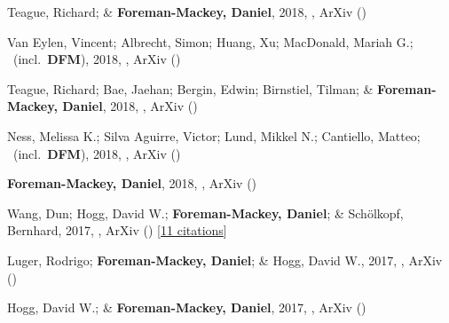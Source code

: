 \item[{\color{numcolor}\scriptsize37}] Teague, Richard; \& \textbf{Foreman-Mackey, Daniel}, 2018, , ArXiv ()

\item[{\color{numcolor}\scriptsize36}] Van Eylen, Vincent; Albrecht, Simon; Huang, Xu; MacDonald, Mariah G.; \etal\ (incl.\ \textbf{DFM}), 2018, , ArXiv ()

\item[{\color{numcolor}\scriptsize35}] Teague, Richard; Bae, Jaehan; Bergin, Edwin; Birnstiel, Tilman; \& \textbf{Foreman-Mackey, Daniel}, 2018, , ArXiv ()

\item[{\color{numcolor}\scriptsize34}] Ness, Melissa K.; Silva Aguirre, Victor; Lund, Mikkel N.; Cantiello, Matteo; \etal\ (incl.\ \textbf{DFM}), 2018, , ArXiv ()

\item[{\color{numcolor}\scriptsize33}] \textbf{Foreman-Mackey, Daniel}, 2018, , ArXiv ()

\item[{\color{numcolor}\scriptsize32}] Wang, Dun; Hogg, David W.; \textbf{Foreman-Mackey, Daniel}; \& Sch{\"o}lkopf, Bernhard, 2017, , ArXiv () [\href{https://ui.adsabs.harvard.edu/abs/2017arXiv171002428W}{11 citations}]

\item[{\color{numcolor}\scriptsize31}] Luger, Rodrigo; \textbf{Foreman-Mackey, Daniel}; \& Hogg, David W., 2017, , ArXiv ()

\item[{\color{numcolor}\scriptsize30}] Hogg, David W.; \& \textbf{Foreman-Mackey, Daniel}, 2017, , ArXiv ()

